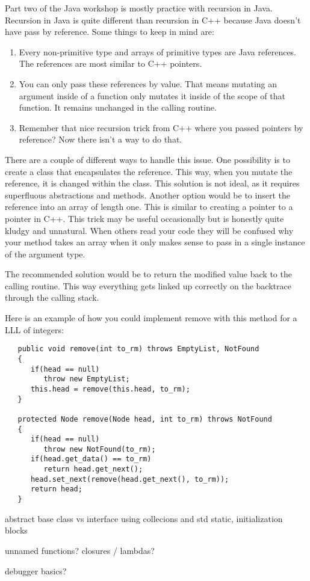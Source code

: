\documentclass[../../main.tex]{subfiles}
\begin{document}
Part two of the Java workshop is mostly practice with recursion in Java. Recursion in Java is quite
different than recursion in C++ because Java doesn't have pass by reference.
Some things to keep in mind are:
   \begin{enumerate}[label=\Alph*.]
         \item Every non-primitive type and arrays of primitive types are Java references. The references
            are most similar to C++ pointers.
         \item You can only pass these references by value. That means mutating an argument inside of
            a function only mutates it inside of the scope of that function. It remains unchanged in
            the calling routine.
         \item Remember that nice recursion trick from C++ where you passed pointers by reference? Now
            there isn't a way to do that.
   \end{enumerate}

There are a couple of different ways to handle this issue. One possibility is to create a class that
encapsulates the reference. This way, when you mutate the reference, it is changed within the class.
This solution is not ideal, as it requires superfluous abstractions and methods. Another option would
be to insert the reference into an array of length one. This is similar to creating a pointer to a pointer
in C++. This trick may be useful occasionally but is honestly quite kludgy and unnatural. When others
read your code they will be confused why your method takes an array when it only makes sense to pass in a
single instance of the argument type.

The recommended solution would be to return the modified value back to the calling routine. This way
everything gets linked up correctly on the backtrace through the calling stack.

Here is an example of how you could implement remove with this method for a LLL of integers:

\begin{verbatim}
   public void remove(int to_rm) throws EmptyList, NotFound
   {
      if(head == null)
         throw new EmptyList;
      this.head = remove(this.head, to_rm);
   }

   protected Node remove(Node head, int to_rm) throws NotFound
   {
      if(head == null)
         throw new NotFound(to_rm);
      if(head.get_data() == to_rm)
         return head.get_next();
      head.set_next(remove(head.get_next(), to_rm));
      return head;
   }
\end{verbatim}

abstract base class vs interface
using collecions and std
static, initialization blocks

unnamed functions? closures / lambdas?

debugger basics?
\end{document}
